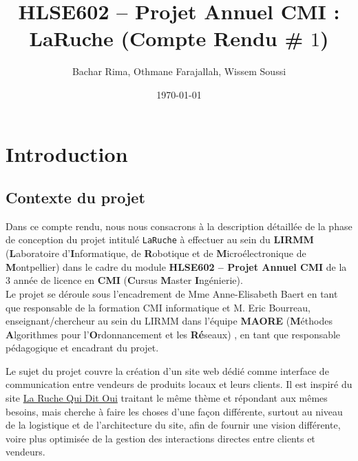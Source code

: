 \documentclass[a4paper,12pt]{book}
\title{\textbf{HLSE602 -- Projet Annuel CMI} : \textbf{LaRuche} (Compte Rendu \# $1$)}
\author{Bachar Rima, Othmane Farajallah, Wissem Soussi}
\date{\today}
\theoremstyle{break}
\theoremstyle{break}
\theoremstyle{break}
\theoremstyle{break}
\theoremstyle{definition}
\theoremstyle{remark}
\begin{document}
\pagestyle{plain}

\maketitle

{
  \hypersetup{linkcolor=black}
  \tableofcontents
}

\chapter{Introduction}
\section{Contexte du projet}
Dans ce compte rendu, nous nous consacrons à la description détaillée de la phase de conception du projet intitulé \texttt{LaRuche} à effectuer au sein du \textbf{LIRMM} (\textbf{L}aboratoire d'\textbf{I}nformatique, de \textbf{R}obotique et de \textbf{M}icroélectronique de \textbf{M}ontpellier) dans le cadre du module \textbf{HLSE602 -- Projet Annuel CMI} de la $3$\ieme{} année de licence en \textbf{CMI} (\textbf{C}ursus \textbf{M}aster \textbf{I}ngénierie).\\
Le projet se déroule sous l'encadrement de Mme Anne-Elisabeth Baert en tant que responsable de la formation CMI informatique et M. Eric Bourreau, enseignant/chercheur au sein du LIRMM dans l'équipe \textbf{MAORE} (\textbf{M}éthodes \textbf{A}lgorithmes pour l'\textbf{O}rdonnancement et les \textbf{Ré}seaux) \citep{EricBourreauPres}, en tant que responsable pédagogique et encadrant du projet.

Le sujet du projet couvre la création d'un site web dédié comme interface de communication entre vendeurs de produits locaux et leurs clients. Il est inspiré du site \href{https://laruchequiditoui.fr/fr}{La Ruche Qui Dit Oui} traitant le même thème et répondant aux mêmes besoins, mais cherche à faire les choses d'une façon différente, surtout au niveau de la logistique et de l'architecture du site, afin de fournir une vision différente, voire plus optimisée de la gestion des interactions directes entre clients et vendeurs.
\end{document}
